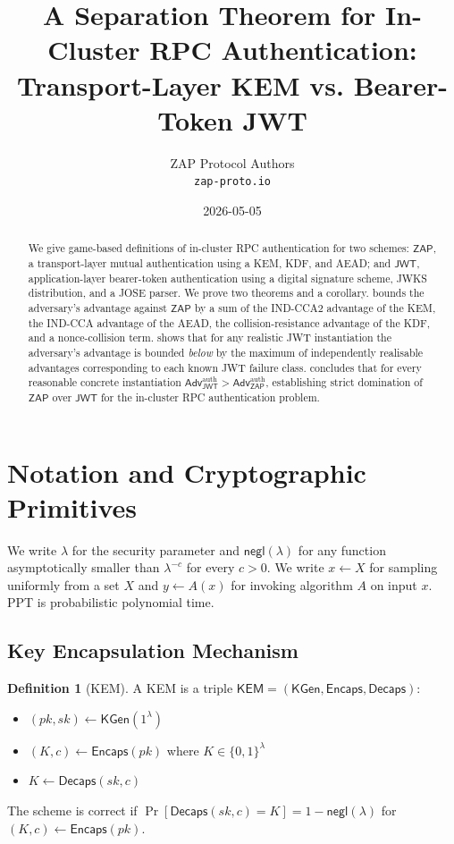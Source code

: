 \documentclass[11pt,a4paper]{article}
\title{A Separation Theorem for In-Cluster RPC Authentication:\\
       Transport-Layer KEM vs. Bearer-Token JWT}
\author{ZAP Protocol Authors\\
        \texttt{zap-proto.io}}
\date{2026-05-05}
\theoremstyle{plain}
\theoremstyle{definition}
\newtheorem{definition}[theorem]{Definition}
\newcommand{\Adv}{\mathsf{Adv}}
\newcommand{\KEM}{\mathsf{KEM}}
\newcommand{\JWT}{\mathsf{JWT}}
\newcommand{\ZAP}{\mathsf{ZAP}}
\newcommand{\negl}{\mathsf{negl}}
\newcommand{\KeyGen}{\mathsf{KGen}}
\newcommand{\Encaps}{\mathsf{Encaps}}
\newcommand{\Decaps}{\mathsf{Decaps}}
\begin{document}
\maketitle

\begin{abstract}
We give game-based definitions of in-cluster RPC authentication for two
schemes: $\ZAP$, a transport-layer mutual authentication using a KEM, KDF,
and AEAD; and $\JWT$, application-layer bearer-token authentication using
a digital signature scheme, JWKS distribution, and a JOSE parser. We prove
two theorems and a corollary.  bounds the adversary's
advantage against $\ZAP$ by a sum of the IND-CCA2 advantage of the KEM,
the IND-CCA advantage of the AEAD, the collision-resistance advantage of
the KDF, and a nonce-collision term.  shows that for any
realistic JWT instantiation the adversary's advantage is bounded
\emph{below} by the maximum of independently realisable advantages
corresponding to each known JWT failure class.  concludes
that for every reasonable concrete instantiation
$\Adv_\JWT^{\text{auth}} > \Adv_\ZAP^{\text{auth}}$, establishing strict
domination of $\ZAP$ over $\JWT$ for the in-cluster RPC authentication
problem.
\end{abstract}

\tableofcontents

\section{Notation and Cryptographic Primitives}
\label{sec:notation}

We write $\lambda$ for the security parameter and $\negl(\lambda)$ for any
function asymptotically smaller than $\lambda^{-c}$ for every $c > 0$.
We write $x \gets X$ for sampling uniformly from a set $X$ and $y \gets
A(x)$ for invoking algorithm $A$ on input $x$. PPT is probabilistic
polynomial time.

\subsection{Key Encapsulation Mechanism}

\begin{definition}[KEM]
A KEM is a triple $\KEM = (\KeyGen, \Encaps, \Decaps)$:
\begin{itemize}[itemsep=2pt,topsep=2pt]
  \item $(pk, sk) \gets \KeyGen(1^\lambda)$
  \item $(K, c) \gets \Encaps(pk)$ where $K \in \{0,1\}^\lambda$
  \item $K \gets \Decaps(sk, c)$
\end{itemize}
The scheme is correct if $\Pr[\Decaps(sk, c) = K] = 1 - \negl(\lambda)$ for
$(K,c) \gets \Encaps(pk)$.
\end{definition}
\end{document}
